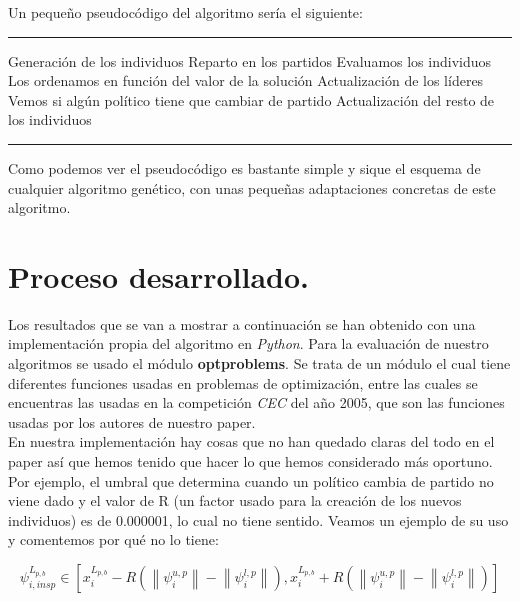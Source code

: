 \documentclass[12pt]{article}
\newenvironment{codigo}
 {\par\addvspace{\topsep}
  \centering
  \begin{minipage}{\linewidth}
  \hrule\kern2pt}
 {\par\kern2pt\hrule
  \end{minipage}
  \par\addvspace{\topsep}}
\numberwithin{figure}{section} %
\numberwithin{table}{section} %
\begin{document}
	Un pequeño pseudocódigo del algoritmo sería el siguiente:
	
	\begin{codigo}
	\begin{algorithmic}[1]
	\State Generación de los individuos
	\State Reparto en los partidos
	\State Evaluamos los individuos
	\State Los ordenamos en función del valor de la solución
	\State Actualización de los líderes
	\State Vemos si algún político tiene que cambiar de partido
	\State Actualización del resto de los individuos
	\EndWhile
	\EndFunction
	\end{algorithmic}
	\end{codigo}

	Como podemos ver el pseudocódigo es bastante simple y sique el esquema de cualquier algoritmo genético, con unas pequeñas adaptaciones concretas de este algoritmo.
	
	\section[Proceso desarrollado.]{Proceso desarrollado.}
	
	Los resultados que se van a mostrar a continuación se han obtenido con una implementación propia del algoritmo en \textit{Python}. Para la evaluación de nuestro algoritmos se usado el módulo \textbf{optproblems}. Se trata de un módulo el cual tiene diferentes funciones usadas en problemas de optimización, entre las cuales se encuentras las usadas en la competición \textit{CEC} del año 2005, que son las funciones usadas por los autores de nuestro paper. \\
	
	En nuestra implementación hay cosas que no han quedado claras del todo en el paper así que hemos tenido que hacer lo que hemos considerado más oportuno. Por ejemplo, el umbral que determina cuando un político cambia de partido no viene dado y el valor de R (un factor usado para la creación de los nuevos individuos) es de 0.000001, lo cual no tiene sentido. Veamos un ejemplo de su uso y comentemos por qué no lo tiene: 
	
	\begin{equation} \label{equation}
		\psi _{i, insp}^{L_{p,b}} \in \left [ x_{i}^{L_{p,b}} - R \left ( \left \| \psi _{i}^{u, p} \right \| - \left \| \psi _{i}^{l, p} \right \| \right ), x_{i}^{L_{p,b}} + R \left ( \left \| \psi _{i}^{u, p} \right \| - \left \| \psi _{i}^{l, p} \right \| \right ) \right ]
	\end{equation}
	
\end{document}
